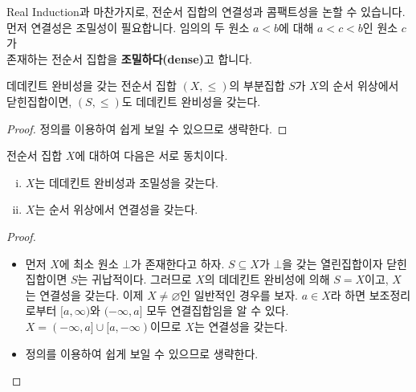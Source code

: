 \documentclass[serif]{beamer}
\begin{document}
\begin{frame}{}
    Real Induction과 마찬가지로, 전순서 집합의 연결성과 콤팩트성을 논할 수 있습니다. 먼저 연결성은 조밀성이 필요합니다.
    임의의 두 원소 $a<b$에 대해 $a<c<b$인 원소 $c$가 \\ 존재하는 전순서 집합을 \textbf{조밀하다(dense)}고 합니다.
    \begin{lemma*}{}
        데데킨트 완비성을 갖는 전순서 집합 $(X,\leq)$의 부분집합 $S$가 $X$의 순서 위상에서 \\
        닫힌집합이면, $(S,\leq)$도 데데킨트 완비성을 갖는다.
    \end{lemma*}
    \begin{proof}
        정의를 이용하여 쉽게 보일 수 있으므로 생략한다.
    \end{proof}
    \begin{thm*}{}
        전순서 집합 $X$에 대하여 다음은 서로 동치이다.
        \begin{enumerate}[(i)]
            \item $X$는 데데킨트 완비성과 조밀성을 갖는다.
            \item $X$는 순서 위상에서 연결성을 갖는다.
        \end{enumerate}
    \end{thm*}
    \begin{proof}
        \begin{itemize}
            \item[($\Rightarrow$)] 먼저 $X$에 최소 원소 $\bot$가 존재한다고 하자. $S\subseteq X$가 $\bot$을 갖는 열린집합이자 닫힌집합이면 $S$는 귀납적이다.
                그러므로 $X$의 데데킨트 완비성에 의해 $S=X$이고, $X$는 연결성을 갖는다. 이제 $X\ne\varnothing$인 일반적인 경우를 보자. $a\in X$라 하면 보조정리로부터
                $[a,\infty)$와 $(-\infty,a]$ 모두 연결집합임을 알 수 있다. $X=(-\infty,a]\cup[a,-\infty)$이므로 $X$는 연결성을 갖는다.
            \item[($\Leftarrow$)] 정의를 이용하여 쉽게 보일 수 있으므로 생략한다.
        \end{itemize}
    \end{proof}
\end{frame}
\end{document}
